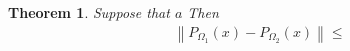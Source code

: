 \documentclass{article}
\newtheorem{theorem}{Theorem}[section]
\newtheorem{lemma}[theorem]{Lemma}
\theoremstyle{case}
\newcommand{\xo}{{{\bar x}}}
\def\includeproofs{1}
\begin{document}
% 
% 
% 


% 


\begin{theorem}
\label{bounded_projection_theorem}
Suppose that $a$
Then
\begin{align}
\left\|P_{\Omega_1}(x) - P_{\Omega_2}(x)\right\| \le 
\end{align}
\end{theorem}
\end{document}
